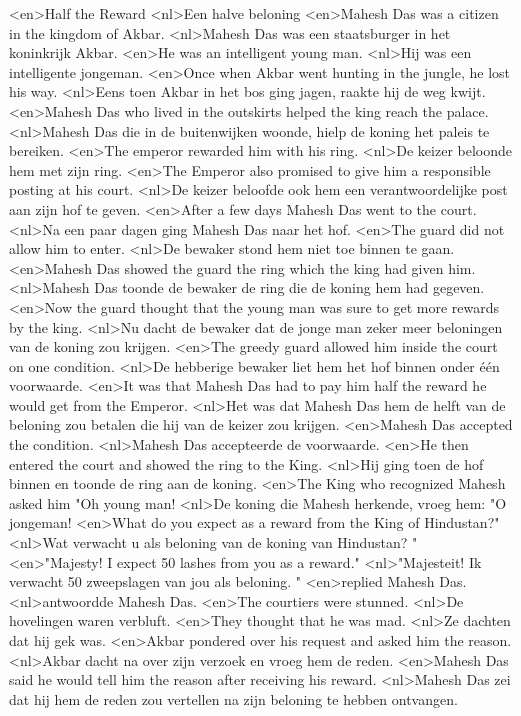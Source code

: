 <en>Half the Reward
<nl>Een halve beloning
<en>Mahesh Das was a citizen in the kingdom of Akbar.
<nl>Mahesh Das was een staatsburger in het koninkrijk Akbar.
<en>He was an intelligent young man.
<nl>Hij was een intelligente jongeman.
<en>Once when Akbar went hunting in the jungle, he lost his way.
<nl>Eens toen Akbar in het bos ging jagen, raakte hij de weg kwijt.
<en>Mahesh Das who lived in the outskirts helped the king reach the palace.
<nl>Mahesh Das die in de buitenwijken woonde, hielp de koning het paleis te bereiken.
<en>The emperor rewarded him with his ring.
<nl>De keizer beloonde hem met zijn ring.
<en>The Emperor also promised to give him a responsible posting at his court.
<nl>De keizer beloofde ook hem een verantwoordelijke post aan zijn hof te geven.
<en>After a few days Mahesh Das went to the court.
<nl>Na een paar dagen ging Mahesh Das naar het hof.
<en>The guard did not allow him to enter.
<nl>De bewaker stond hem niet toe  binnen te gaan.
<en>Mahesh Das showed the guard the ring which the king had given him.
<nl>Mahesh Das toonde de bewaker de ring die de koning hem had gegeven.
<en>Now the guard thought that the young man was sure to get more rewards by the king.
<nl>Nu dacht de bewaker dat de jonge man zeker meer beloningen van de koning zou krijgen.
<en>The greedy guard  allowed him inside the court on one condition.
<nl>De hebberige bewaker liet hem het hof  binnen onder één voorwaarde.
<en>It was that Mahesh Das had to pay him half the reward he would get from the Emperor.
<nl>Het was dat Mahesh Das hem de helft van de beloning zou betalen die hij van de keizer zou krijgen.
<en>Mahesh Das accepted the condition.
<nl>Mahesh Das accepteerde de voorwaarde.
<en>He then entered the court and showed the ring to the King.
<nl>Hij ging toen de hof binnen en toonde de ring aan de koning.
<en>The King who recognized Mahesh asked him "Oh young man!
<nl>De koning die Mahesh herkende, vroeg hem: "O jongeman!
<en>What do you expect as a reward from the King of Hindustan?"
<nl>Wat verwacht u als beloning van de koning van Hindustan? "
<en>"Majesty! I expect 50 lashes from you as a reward."
<nl>"Majesteit! Ik verwacht 50 zweepslagen van jou als beloning. "
<en>replied Mahesh Das.
<nl>antwoordde Mahesh Das.
<en>The courtiers were stunned.
<nl>De hovelingen waren verbluft.
<en>They thought that he was mad.
<nl>Ze dachten dat hij gek was.
<en>Akbar pondered over his request and asked him the reason.
<nl>Akbar dacht na over zijn verzoek en vroeg hem de reden.
<en>Mahesh Das said he would tell him the reason after receiving his reward.
<nl>Mahesh Das zei dat hij hem de reden zou vertellen na  zijn beloning te hebben ontvangen.

